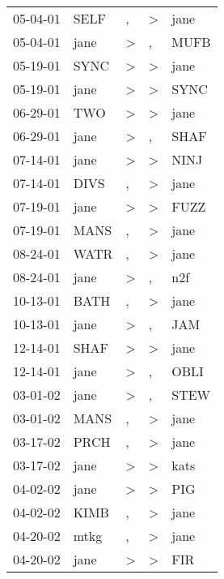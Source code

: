 \begin{supertabular}{lllll}
 05-04-01 &   SELF &             , &     \textgreater &   jane \\
 05-04-01 &   jane &  \textgreater &                , &   MUFB \\
 05-19-01 &   SYNC &  \textgreater &     \textgreater &   jane \\
 05-19-01 &   jane &  \textgreater &     \textgreater &   SYNC \\
 06-29-01 &    TWO &  \textgreater &     \textgreater &   jane \\
 06-29-01 &   jane &  \textgreater &                , &   SHAF \\
 07-14-01 &   jane &  \textgreater &     \textgreater &   NINJ \\
 07-14-01 &   DIVS &             , &     \textgreater &   jane \\
 07-19-01 &   jane &  \textgreater &     \textgreater &   FUZZ \\
 07-19-01 &   MANS &             , &     \textgreater &   jane \\
 08-24-01 &   WATR &             , &     \textgreater &   jane \\
 08-24-01 &   jane &  \textgreater &                , &    n2f \\
 10-13-01 &   BATH &             , &     \textgreater &   jane \\
 10-13-01 &   jane &  \textgreater &                , &    JAM \\
 12-14-01 &   SHAF &  \textgreater &     \textgreater &   jane \\
 12-14-01 &   jane &  \textgreater &                , &   OBLI \\
 03-01-02 &   jane &  \textgreater &                , &   STEW \\
 03-01-02 &   MANS &             , &     \textgreater &   jane \\
 03-17-02 &   PRCH &             , &     \textgreater &   jane \\
 03-17-02 &   jane &  \textgreater &     \textgreater &   kats \\
 04-02-02 &   jane &  \textgreater &     \textgreater &    PIG \\
 04-02-02 &   KIMB &             , &     \textgreater &   jane \\
 04-20-02 &   mtkg &             , &     \textgreater &   jane \\
 04-20-02 &   jane &  \textgreater &     \textgreater &    FIR \\

\end{supertabular}
